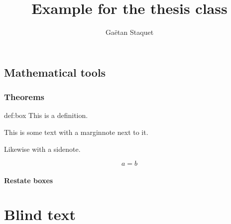 \documentclass[
  a4paper,
  fontsize = 11pt,
  english,
  openany,
  twoside=false,
  roman equations,
]{thesis}
\title{Example for the thesis class}
\author{Gaëtan Staquet}
\begin{document}
  \frontmatter
  \maketitle

  \mainmatter

  \chapter{Mathematical tools}

  \section{Theorems}

  \begin{definition*}{def:box}
    This is a definition.
  \end{definition*}

  This is some text with a marginnote next to it.

  Likewise with a sidenote.

  \begin{equation}
    a = b
  \end{equation}

  \subsection{Restate boxes}


  \part{Blind text}

  \Blinddocument

  \backmatter

  \Blinddocument
\end{document}

